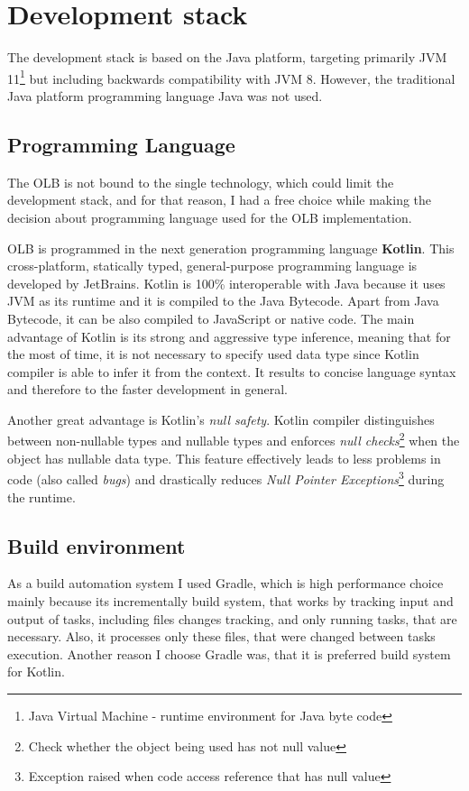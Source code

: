 \section{Development stack}\label{sec:development-stack}
The development stack is based on the Java platform, 
targeting primarily JVM 11\footnote{Java Virtual Machine - runtime environment for Java byte code}
but including backwards compatibility with JVM 8.
However, 
the traditional Java platform programming language Java was not used.

\subsection{Programming Language}\label{subsec:programming-language}
The OLB is not bound to the single technology, which could limit the development stack,  
and for that reason,
I had a free choice while making the decision about programming language used for the OLB implementation.

OLB is programmed in the next generation programming language \textbf{Kotlin}.
This cross-platform, statically typed, general-purpose programming language is developed by JetBrains.
Kotlin is 100\% interoperable with Java because it uses JVM as its runtime and it is compiled to the Java Bytecode.
Apart from Java Bytecode, it can be also compiled to JavaScript or native code.
The main advantage of Kotlin is its strong and aggressive type inference,
meaning that for the most of time,
it is not necessary to specify used data type since Kotlin compiler is able to infer it from the context.
It results to concise language syntax and therefore to the faster development in general.

Another great advantage is Kotlin's \textit{null safety}. 
Kotlin compiler distinguishes between non-nullable types and nullable types 
and enforces \textit{null checks}\footnote{Check whether the object being used has not null value} when the object has nullable data type.
This feature effectively leads to less problems in code (also called \textit{bugs})
and drastically reduces \textit{Null Pointer Exceptions}\footnote{Exception raised when code access reference that has null value}
during the runtime.


\subsection{Build environment}
As a build automation system I used Gradle, 
which is high performance choice mainly because its incrementally build system,
that works by tracking input and output of tasks, 
including files changes tracking, and only running tasks, that are necessary. 
Also, it processes only these files, that were changed between tasks execution. 
Another reason I choose Gradle was, that it is preferred build system for Kotlin.


